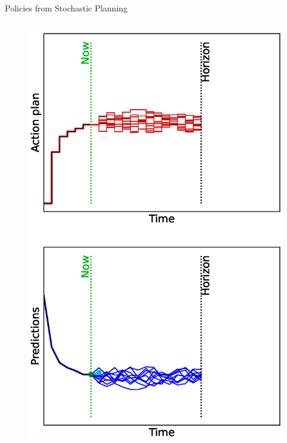 \documentclass[lecture]{beamer}
\begin{document}
\begin{frame}{\normalsize Policies from Stochastic Planning}
\begin{columns}
\begin{overlayarea}{\textwidth}{0.9\textheight}
\begin{figure}
{          \includegraphics[width=\FS\textwidth,clip]{Codes/MPC/MPCMCWRONG6.eps}
        }%
        {%
}
\end{figure}
\end{overlayarea}
\end{columns}
\end{frame}
\end{document}
